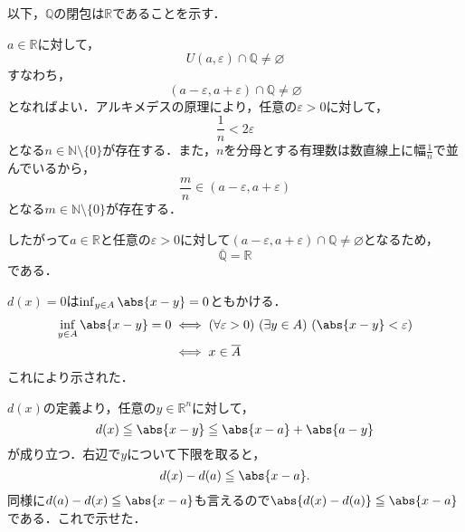 \begin{tanswer}
    以下，$\mathbb{Q}$の閉包は$\mathbb{R}$であることを示す．

    $a \in \mathbb{R}$に対して，
    \[
        U(a,\varepsilon) \cap \mathbb{Q} \ne \varnothing
    \]
    すなわち，
    \[
        (a-\varepsilon,a+\varepsilon) \cap \mathbb{Q} \ne \varnothing
    \]
    となればよい．アルキメデスの原理により，任意の$\varepsilon >0$に対して，
    \[
        \frac{1}{n}< 2\varepsilon
    \]
    となる$n \in \mathbb{N} \setminus \{0\}$が存在する．また，$n$を分母とする有理数は数直線上に幅$\frac{1}{n}$で並んでいるから，
    \[
        \frac{m}{n} \in (a-\varepsilon,a+\varepsilon)
    \]
    となる$ m \in \mathbb{N} \setminus \{0\}$が存在する．\par
    したがって$a \in \mathbb{R}$と任意の$\varepsilon>0$に対して$(a-\varepsilon,a+\varepsilon) \cap \mathbb{Q} \ne \varnothing$となるため，
    \[
        \overline{\mathbb{Q}}=\mathbb{R}
    \]
    である．
\end{tanswer}





\begin{tproof}
    $d(x)=0$は$\inf_{y \in A} \abs{x-y} =0$ともかける．
    \begin{align*}
        \inf_{y \in A} \abs{x-y} =0 & \iff (\forall \varepsilon>0) \ (\exists y \in A)\ ( \abs{x-y}<\varepsilon ) \\
                                    & \iff x \in \overline{A}
    \end{align*}
    これにより示された．
\end{tproof}




\begin{tanswer}
    $d(x)$の定義より，任意の$y \in \mathbb{R} ^n$に対して，
    \[
        d(x) \leq \abs{x-y} \leq \abs{x-a} + \abs{a-y}
    \]
    が成り立つ．右辺で$y$について下限を取ると，
    \[
        d(x) - d(a) \leq \abs{x-a}.
    \]
    同様に$d(a) - d(x) \leq \abs{x-a}$も言えるので$\abs{d(x) - d(a)} \leq \abs{x-a}$である．これで示せた．
\end{tanswer}


